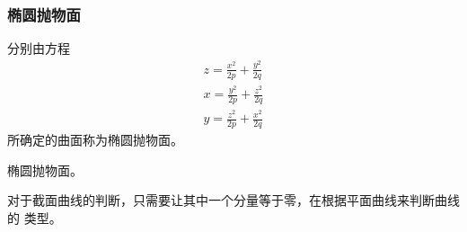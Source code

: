 \subsubsection{椭圆抛物面}
分别由方程
\begin{align}
    z = \frac{x^2}{2p} + \frac{y^2}{2q} \\
    x = \frac{y^2}{2p} + \frac{z^2}{2q} \\
    y = \frac{z^2}{2p} + \frac{x^2}{2q}
\end{align}
所确定的曲面称为椭圆抛物面。
\begin{marginfigure}
    \centering
    \caption{椭圆抛物面。}
\end{marginfigure}

对于截面曲线的判断，只需要让其中一个分量等于零，在根据平面曲线来判断曲线的 类型。